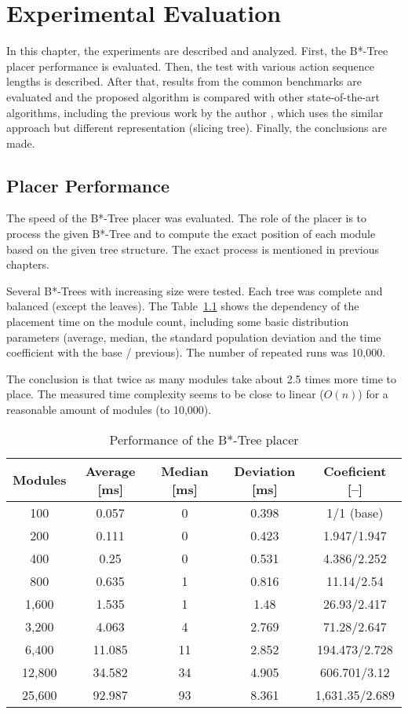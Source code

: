 \chapter{Experimental Evaluation}
\label{sec:testing}

In this chapter, the experiments are described and analyzed. First, the B*-Tree placer performance is evaluated. Then, the test with various action sequence lengths is described. After that, results from the common benchmarks are evaluated and the proposed algorithm is compared with other state-of-the-art algorithms, including the previous work by the author \cite{vh}, which uses the similar approach but different representation (slicing tree). Finally, the conclusions are made.

\section{Placer Performance}

The speed of the B*-Tree placer was evaluated. The role of the placer is to process the given B*-Tree and to compute the exact position of each module based on the given tree structure. The exact process is mentioned in previous chapters. 

Several B*-Trees with increasing size were tested. Each tree was complete and balanced (except the leaves). The Table~\ref{tab:placer} shows the dependency of the placement time on the module count, including some basic distribution parameters (average, median, the standard population deviation and the time coefficient with the base / previous). The number of repeated runs was 10,000.

The conclusion is that twice as many modules take about 2.5 times more time to place. The measured time complexity seems to be close to linear ($O(n)$) for a reasonable amount of modules (to 10,000).

\begin{table}
\centering
\begin{tabular}{|c|c|c|c|c|}
\hline
Modules & Average [ms] & Median [ms] & Deviation [ms] & Coeficient [--] \\ 
\hline
\hline
100 & 0.057 & 0 & 0.398 & 1/1 (base) \\
\hline
200 & 0.111 & 0 & 0.423 & 1.947/1.947 \\
\hline
400 & 0.25 & 0 & 0.531 & 4.386/2.252 \\
\hline
800 & 0.635 & 1 & 0.816 & 11.14/2.54 \\
\hline
1,600 & 1.535 & 1 & 1.48 & 26.93/2.417 \\
\hline
3,200 & 4.063 & 4 & 2.769 & 71.28/2.647 \\ 
\hline
6,400 & 11.085 & 11 & 2.852 & 194.473/2.728 \\
\hline
12,800 & 34.582 & 34 & 4.905 & 606.701/3.12 \\
\hline
25,600 & 92.987 & 93 & 8.361 & 1,631.35/2.689 \\
\hline
\end{tabular}
\caption{Performance of the B*-Tree placer}
\label{tab:placer}
\end{table}

